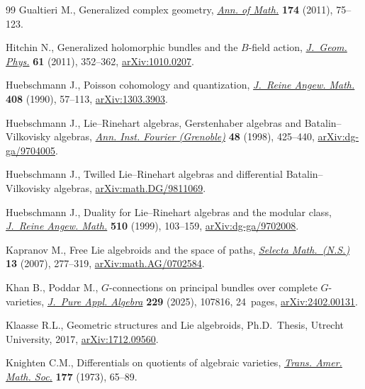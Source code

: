 \documentclass[pdftex]{sigma}
\numberwithin{equation}{section}
\theoremstyle{definition}
\begin{document}
\begin{thebibliography}{99}
Gualtieri M., Generalized complex geometry,
 \href{https://doi.org/10.4007/annals.2011.174.1.3}{\textit{Ann. of Math.}}
 \textbf{174} (2011), 75--123.

Hitchin N., Generalized holomorphic bundles and the {$B$}-field action,
 \href{https://doi.org/10.1016/j.geomphys.2010.10.014}{\textit{J.~Geom.
 Phys.}} \textbf{61} (2011), 352--362,
 \href{http://arxiv.org/abs/1010.0207}{arXiv:1010.0207}.

Huebschmann J., Poisson cohomology and quantization,
 \href{https://doi.org/10.1515/crll.1990.408.57}{\textit{J.~Reine Angew.
 Math.}} \textbf{408} (1990), 57--113,
 \href{http://arxiv.org/abs/1303.3903}{arXiv:1303.3903}.

Huebschmann J., Lie--{R}inehart algebras, {G}erstenhaber algebras and
 {B}atalin--{V}ilkovisky algebras,
 \href{https://doi.org/10.5802/aif.1624}{\textit{Ann. Inst. Fourier
 (Grenoble)}} \textbf{48} (1998), 425--440,
 \href{http://arxiv.org/abs/dg-ga/9704005}{arXiv:dg-ga/9704005}.

Huebschmann J., Twilled {L}ie--{R}inehart algebras and differential
 {B}atalin--{V}ilkovisky algebras,
 \href{http://arxiv.org/abs/math.DG/9811069}{arXiv:math.DG/9811069}.

Huebschmann J., Duality for {L}ie--{R}inehart algebras and the modular class,
 \href{https://doi.org/10.1515/crll.1999.043}{\textit{J.~Reine Angew. Math.}}
 \textbf{510} (1999), 103--159,
 \href{http://arxiv.org/abs/dg-ga/9702008}{arXiv:dg-ga/9702008}.

Kapranov M., Free {L}ie algebroids and the space of paths,
 \href{https://doi.org/10.1007/s00029-007-0041-9}{\textit{Selecta
 Math.~(N.S.)}} \textbf{13} (2007), 277--319,
 \href{http://arxiv.org/abs/math.AG/0702584}{arXiv:math.AG/0702584}.

Khan B., Poddar M., {$G$}-connections on principal bundles over complete
 {$G$}-varieties,
 \href{https://doi.org/10.1016/j.jpaa.2024.107816}{\textit{J.~Pure Appl.
 Algebra}} \textbf{229} (2025), 107816, 24~pages,
 \href{http://arxiv.org/abs/2402.00131}{arXiv:2402.00131}.

Klaasse R.L., Geometric structures and {L}ie algebroids, Ph.D.~Thesis,
 {U}trecht {U}niversity, 2017,
 \href{http://arxiv.org/abs/1712.09560}{arXiv:1712.09560}.

Knighten C.M., Differentials on quotients of algebraic varieties,
 \href{https://doi.org/10.2307/1996584}{\textit{Trans. Amer. Math. Soc.}}
 \textbf{177} (1973), 65--89.


\end{thebibliography}
\end{document}
